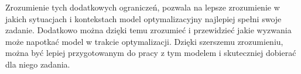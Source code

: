 \par Zrozumienie tych dodatkowych ograniczeń, pozwala na lepsze zrozumienie w jakich sytuacjach i kontekstach model optymalizacyjny najlepiej spełni swoje zadanie. Dodatkowo można dzięki temu zrozumieć i przewidzieć jakie wyzwania może napotkać model w trakcie optymalizacji. Dzięki szerszemu zrozumieniu, można być lepiej przygotowanym do pracy z tym modelem i skuteczniej dobierać dla niego zadania.

